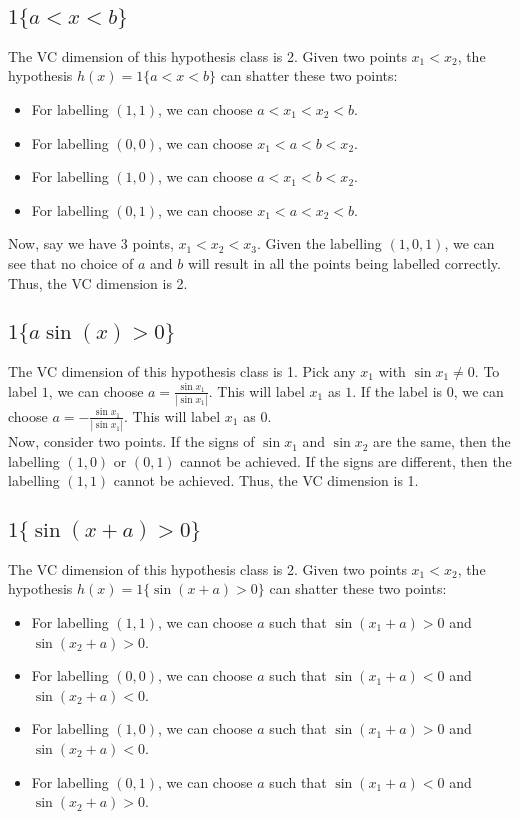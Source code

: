 \documentclass[a4paper]{article}
\begin{document}
\subsection{$1\{a < x < b\}$}

The VC dimension of this hypothesis class is 2. Given two points $x_1 < x_2$, the hypothesis $h(x) = 1\{a < x < b\}$ can shatter these two points:

\begin{itemize}
    \item For labelling $(1, 1)$, we can choose $a < x_1 < x_2 < b$.
    \item For labelling $(0, 0)$, we can choose $x_1 < a < b < x_2$.
    \item For labelling $(1, 0)$, we can choose $a < x_1 < b < x_2$.
    \item For labelling $(0, 1)$, we can choose $x_1 < a < x_2 < b$.
\end{itemize}


Now, say we have 3 points, $x_1 < x_2 < x_3$. Given the labelling $(1, 0, 1)$, we can see that no choice of $a$ and $b$ will result in all the points being labelled correctly. Thus, the VC dimension is 2.

\subsection{$1\{a \sin(x) > 0\}$}

The VC dimension of this hypothesis class is 1. Pick any $x_1$ with $\sin x_1 \neq 0$. To label $1$, we can choose $a = \frac{\sin x_1}{|\sin x_1|}$. This will label $x_1$ as $1$. If the label is $0$, we can choose $a = -\frac{\sin x_1}{|\sin x_1|}$. This will label $x_1$ as $0$.\\


Now, consider two points. If the signs of $\sin x_1$ and $\sin x_2$ are the same, then the labelling $(1, 0)$ or $(0, 1)$ cannot be achieved. If the signs are different, then the labelling $(1, 1)$ cannot be achieved. Thus, the VC dimension is 1.

\subsection{$1\{\sin (x + a) > 0\}$}

The VC dimension of this hypothesis class is 2. Given two points $x_1 < x_2$, the hypothesis $h(x) = 1\{\sin (x + a) > 0\}$ can shatter these two points:

\begin{itemize}
    \item For labelling $(1, 1)$, we can choose $a$ such that $\sin (x_1 + a) > 0$ and $\sin (x_2 + a) > 0$.
    \item For labelling $(0, 0)$, we can choose $a$ such that $\sin (x_1 + a) < 0$ and $\sin (x_2 + a) < 0$.
    \item For labelling $(1, 0)$, we can choose $a$ such that $\sin (x_1 + a) > 0$ and $\sin (x_2 + a) < 0$.
    \item For labelling $(0, 1)$, we can choose $a$ such that $\sin (x_1 + a) < 0$ and $\sin (x_2 + a) > 0$.
\end{itemize}
\end{document}
